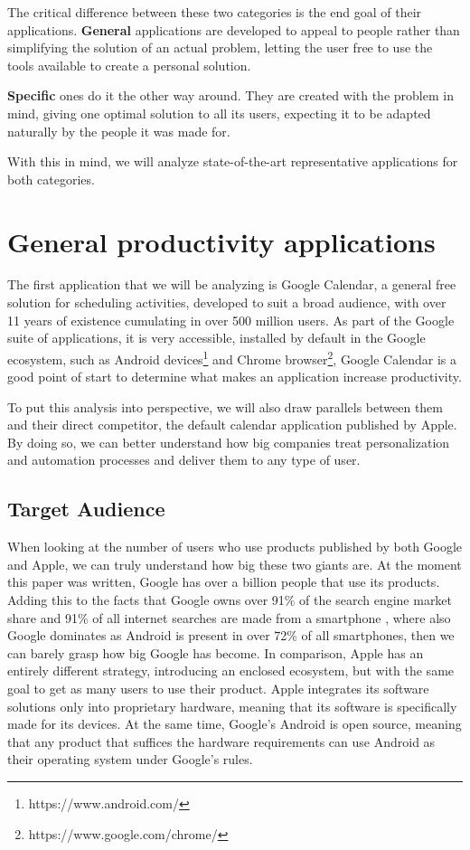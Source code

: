 The critical difference between these two categories is the end goal of their applications. \textbf{General} applications are developed to appeal to people rather than simplifying the solution of an actual problem, letting the user free to use the tools available to create a personal solution. 

\textbf{Specific} ones do it the other way around. They are created with the problem in mind, giving one optimal solution to all its users, expecting it to be adapted naturally by the people it was made for.

With this in mind, we will analyze state-of-the-art representative applications for both categories.


\section{General productivity applications} \label{3:generalapp}
The first application that we will be analyzing is Google Calendar, a general free solution for scheduling activities, developed to suit a broad audience, with over 11 years of existence \cite{google2006calendar} cumulating in over 500 million users. As part of the Google suite of applications, it is very accessible, installed by default in the Google ecosystem, such as Android devices\footnote{https://www.android.com/} and Chrome browser\footnote{https://www.google.com/chrome/}, Google Calendar is a good point of start to determine what makes an application increase productivity.

To put this analysis into perspective, we will also draw parallels between them and their direct competitor, the default calendar application published by Apple. By doing so, we can better understand how big companies treat personalization and automation processes and deliver them to any type of user.


\subsection{Target Audience} \label{3:generalapp_audience}
When looking at the number of users who use products published by both Google and Apple, we can truly understand how big these two giants are.
At the moment this paper was written, Google has over a billion people that use its products. Adding this to the facts that Google owns over 91\% of the search engine market share \cite{statcounter2021google} and 91\% of all internet searches are made from a smartphone \cite{mobile2021market}, where also Google dominates as Android is present in over 72\% of all smartphones, then we can barely grasp how big Google has become.
In comparison, Apple has an entirely different strategy, introducing an enclosed ecosystem, but with the same goal to get as many users to use their product. Apple integrates its software solutions only into proprietary hardware, meaning that its software is specifically made for its devices. At the same time, Google’s Android is open source, meaning that any product that suffices the hardware requirements can use Android as their operating system under Google’s rules. 

